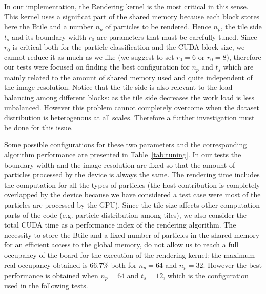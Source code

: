 \documentclass[11pt]{article}
\begin{document}
In our implementation, the Rendering kernel is the most critical in this sense. This kernel uses a significat part of the shared memory because each block stores here the Btile and a number $n_p$ of particles to be rendered. 
Hence $n_p$, the tile side $t_s$ and its boundary width $r_0$ are parameters that must be carefully tuned. 
Since $r_0$ is critical both for the particle classification and the CUDA block size, we cannot reduce it as much as we like (we suggest to set $r_0=6$ or $r_0=8$), therefore our tests were focused on finding the best configuration for $n_p$ and $t_s$ which are mainly related to the amount of shared memory used and quite independent of the image resolution. Notice that the tile side is also relevant to the load balancing among different blocks: as the tile side decreases the work load is less unbalanced. However this problem cannot completely overcome when the dataset distribution is heterogenous at all scales. Therefore a further investigation must be done for this issue.

Some possible configurations for these two parameters and the corresponding algorithm performance are presented in Table~\ref{tab:tuning}. In our tests the boundary width and the image resolution are fixed so that the amount of particles processed by the device is always the same. The rendering time includes the computation for all the types of particles (the host contribution is completely overlapped by the device because we have considered a test case were most of the particles are processed by the GPU). Since the tile size affects other computation parts of the code (e.g. particle distribution among tiles), we also consider the total CUDA time as a performance index of the rendering algorithm. 
The necessity to store the Btile and a fixed number of particles in the shared memory for an efficient access to the global memory, do not allow us to reach a full occupancy of the board for the execution of the rendering kernel: the maximum real occupancy obtained is $66.7\%$ both for $n_p = 64$ and $n_p=32$. However the best performance is obtained when $n_p=64$ and $t_s = 12$, which is the configuration used in the following tests.
\end{document}
